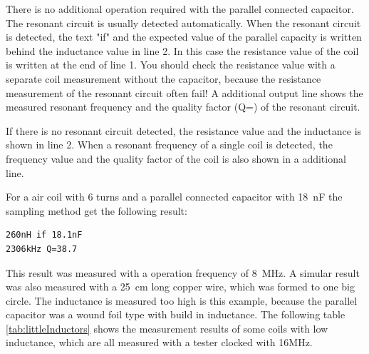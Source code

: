 There is no additional operation required with the parallel connected capacitor.
The resonant circuit is usually detected automatically.
When the resonant circuit is detected, the text "if" and the expected value
of the parallel capacity is written behind the inductance value in line 2.
In this case the resistance value of the coil is written at the end of line 1.
You should check the resistance value with a separate coil measurement without
the capacitor, because the resistance measurement of the resonant circuit often fail!
A additional output line shows the measured resonant frequency and the quality factor (Q=)
of the resonant circuit.

If there is no resonant circuit detected, the resistance value and the inductance is shown
in line 2.
When a resonant frequency of a single coil is detected, the frequency value and the
quality factor of the coil is also shown in a additional line.

For a air coil with 6 turns and a parallel connected capacitor with 18~nF
the sampling method get the following result:

\begin{verbatim}
260nH if 18.1nF
2306kHz Q=38.7
\end{verbatim}

This result was measured with a operation frequency of 8~MHz. A simular result
was also measured with a 25~cm long copper wire, which was formed to one big circle.
The inductance is measured too high is this example, because the parallel capacitor
was a wound foil type with build in inductance.
The following table \ref{tab:littleInductors} shows the measurement results of some
coils with low inductance, which are all measured with a tester clocked with 16MHz.

